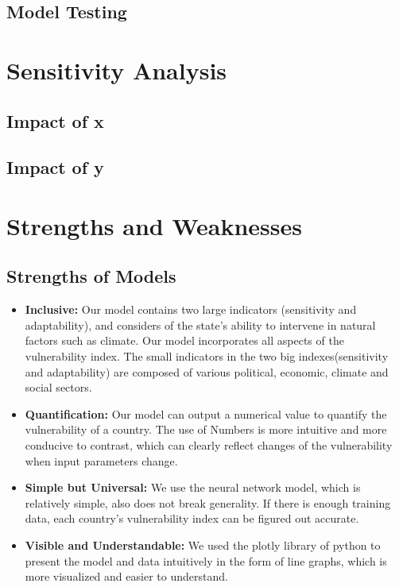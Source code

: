 \documentclass{mcmthesis}
\begin{document}
\subsection{Model Testing}

\section{Sensitivity Analysis}
\subsection{Impact of x}
\subsection{Impact of y}

\section{Strengths and Weaknesses}
\subsection{Strengths of Models}
\begin{itemize}
  \item \textbf{Inclusive:} Our model contains two large indicators (sensitivity and adaptability), and 
  considers of the state's ability to intervene in natural factors such as climate. 
  Our model incorporates all aspects of the vulnerability index. The small indicators 
  in the two big indexes(sensitivity and adaptability) are composed of various political, 
  economic, climate and social sectors.
  \item \textbf{Quantification:} Our model can output a numerical value to quantify the vulnerability of a country. 
  The use of Numbers is more intuitive and more conducive to contrast, which can clearly 
  reflect changes of the vulnerability when input parameters change.
  \item \textbf{Simple but Universal:} We use the neural network model, which is relatively simple, also does not break 
  generality. If there is enough training data, each country's vulnerability index 
  can be figured out  accurate.
  \item \textbf{Visible and Understandable:} We used the plotly library of python to present the model and data 
  intuitively in the form of line graphs, which is more visualized and 
  easier to understand.
\end{itemize}
\end{document}
